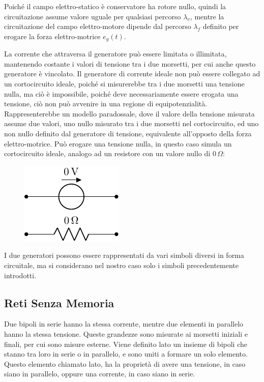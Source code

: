 \documentclass{article}
\numberwithin{equation}{subsection}
\begin{document}
Poiché il campo elettro-statico è conservatore ha rotore nullo, quindi la circuitazione assume valore uguale per qualsiasi percorso $\lambda_v$, mentre la circuitazione 
del campo elettro-motore dipende dal percorso $\lambda_f$ definito per erogare la forza elettro-motrice $e_g(t)$. 

La corrente che attraversa il generatore può essere limitata o illimitata, mantenendo costante i valori di tensione tra i due morsetti, per cui anche questo generatore è vincolato. 
Il generatore di corrente ideale non può essere collegato ad un cortocircuito ideale, poiché si misurerebbe tra i due morsetti una tensione nulla, ma ciò è impossibile, poiché 
deve necessariamente essere erogata una tensione, ciò non può avvenire in una regione di equipotenzialità. Rappresenterebbe un modello paradossale, dove il valore della 
tensione misurata assume due valori, uno nullo misurato tra i due morsetti nel cortocircuito, ed uno non nullo definito dal generatore di tensione, equivalente all'opposto 
della forza elettro-motrice. 
Può erogare una tensione nulla, in questo caso simula un cortocircuito ideale, analogo ad un resistore con un valore nullo di $0\,\Omega$: 
\begin{figure}[H]%
    \centering
    \includegraphics{cortocircuito.pdf}%
    \label{fig:corcocircuito}
\end{figure}

I due generatori possono essere rappresentati da vari simboli diversi in forma circuitale, ma si considerano nel nostro caso solo i simboli precedentemente introdotti.  

\subsection{Reti Senza Memoria}

Due bipoli in serie hanno la stessa corrente, mentre due elementi in parallelo hanno la stessa tensione. Queste grandezze sono misurate ai morsetti iniziali e finali, per cui 
sono misure esterne. 
Viene definito lato un insieme di bipoli che stanno tra loro in serie o in parallelo, e sono uniti a formare un solo elemento. Questo elemento chiamato lato, ha la proprietà di avere 
una tensione, in caso siano in parallelo, oppure una corrente, in caso siano in serie. 
\end{document}
